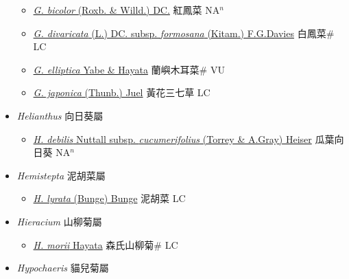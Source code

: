 \begin{itemize}
  \begin{itemize}
        \item[] \href{http://www.theplantlist.org/tpl1.1/search?q=Gynura+bicolor}{\textit{G. bicolor} (Roxb. \& Willd.) DC.}   紅鳳菜 NA$^n$
        \item[] \href{http://www.theplantlist.org/tpl1.1/search?q=Gynura+divaricata+subsp.+formosana}{\textit{G. divaricata} (L.) DC. subsp. \textit{formosana} (Kitam.) F.G.Davies}   白鳳菜\# LC
        \item[] \href{http://www.theplantlist.org/tpl1.1/search?q=Gynura+elliptica}{\textit{G. elliptica} Yabe \& Hayata}   蘭嶼木耳菜\# VU
        \item[] \href{http://www.theplantlist.org/tpl1.1/search?q=Gynura+japonica}{\textit{G. japonica} (Thunb.) Juel}   黃花三七草 LC
  \end{itemize}
 \item[] \textit{Helianthus} 向日葵屬
                    
  \begin{itemize}
        \item[] \href{http://www.theplantlist.org/tpl1.1/search?q=Helianthus+debilis+subsp.+cucumerifolius}{\textit{H. debilis} Nuttall subsp. \textit{cucumerifolius} (Torrey \& A.Gray) Heiser}   瓜葉向日葵 NA$^n$
  \end{itemize}
 \item[] \textit{Hemistepta} 泥胡菜屬
                    
  \begin{itemize}
        \item[] \href{http://www.theplantlist.org/tpl1.1/search?q=Hemistepta+lyrata}{\textit{H. lyrata} (Bunge) Bunge}   泥胡菜 LC
  \end{itemize}
 \item[] \textit{Hieracium} 山柳菊屬
                    
  \begin{itemize}
        \item[] \href{http://www.theplantlist.org/tpl1.1/search?q=Hieracium+morii}{\textit{H. morii} Hayata}   森氏山柳菊\# LC
  \end{itemize}
 \item[] \textit{Hypochaeris} 貓兒菊屬
                    

\end{itemize}
